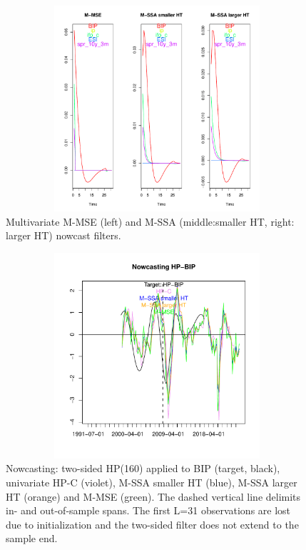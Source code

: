\documentclass[a4paper]{article}
\begin{document}
\begin{figure}[H]\begin{center}\includegraphics[height=3in, width=4.5in]{./Figures/bk_gammak.pdf}\caption{Multivariate M-MSE (left) and M-SSA  (middle:smaller HT, right: larger HT) nowcast filters.\label{bk_gammak}}\end{center}\end{figure}\begin{figure}[H]\begin{center}\includegraphics[height=3in, width=4.5in]{./Figures/mssa_msse_now.pdf}\caption{Nowcasting: two-sided HP(160) applied to BIP (target, black), univariate HP-C (violet), M-SSA smaller HT (blue), M-SSA larger HT (orange) and M-MSE (green). The dashed vertical line delimits in- and out-of-sample spans. The first L=31 observations are lost due to initialization and the two-sided filter does not extend to the sample end.\label{mssa_msse_now}}\end{center}\end{figure}%
\end{document}
